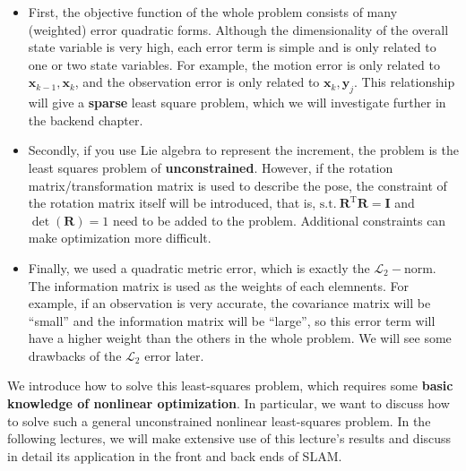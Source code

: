 \begin{itemize}
	\item First, the objective function of the whole problem consists of many (weighted) error quadratic forms. Although the dimensionality of the overall state variable is very high, each error term is simple and is only related to one or two state variables. For example, the motion error is only related to $\mathbf{x}_{k-1}, \mathbf{x}_k$, and the observation error is only related to $\mathbf{x}_k, \mathbf{y}_j$. This relationship will give a \textbf{sparse} least square problem, which we will investigate further in the backend chapter.
	\item Secondly, if you use Lie algebra to represent the increment, the problem is the least squares problem of \textbf{unconstrained}. However, if the rotation matrix/transformation matrix is ​​used to describe the pose, the constraint of the rotation matrix itself will be introduced, that is, $\mathrm{s.t.}\ \mathbf{R}^\mathrm{T} \mathbf{R} = \mathbf{I}$ and $\det (\mathbf{R})=1$ need to be added to the problem. Additional constraints can make optimization more difficult.
	\item Finally, we used a quadratic metric error, which is exactly the $\mathcal{L}_2-$norm. The information matrix is used as the weights of each elemnents. For example, if an observation is very accurate, the covariance matrix will be ``small'' and the information matrix will be ``large'', so this error term will have a higher weight than the others in the whole problem. We will see some drawbacks of the $\mathcal{L}_2$ error later.
\end{itemize}

We introduce how to solve this least-squares problem, which requires some \textbf{basic knowledge of nonlinear optimization}. In particular, we want to discuss how to solve such a general unconstrained nonlinear least-squares problem. In the following lectures, we will make extensive use of this lecture's results and discuss in detail its application in the front and back ends of SLAM\@.

